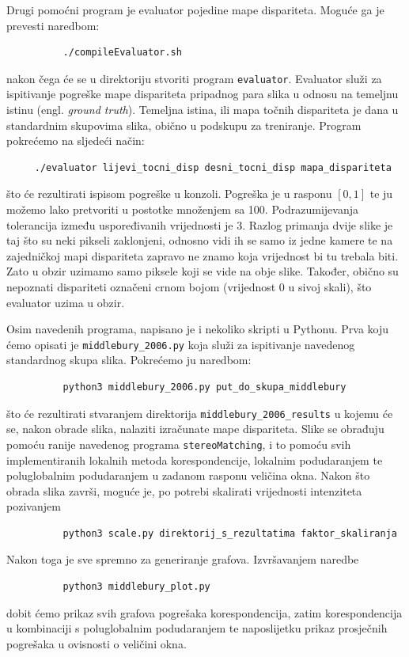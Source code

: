 \documentclass[utf8, zavrsni, numeric]{fer}
\begin{document}
Drugi pomoćni program je evaluator pojedine mape dispariteta. Moguće ga je prevesti naredbom:
\begin{verbatim}
          ./compileEvaluator.sh
\end{verbatim}
nakon čega će se u direktoriju stvoriti program {\tt evaluator}. Evaluator služi za ispitivanje
pogreške mape dispariteta pripadnog para slika u odnosu na temeljnu istinu (engl. {\sl ground truth}). Temeljna istina, ili mapa točnih dispariteta je dana u standardnim skupovima slika, 
obično u podskupu za treniranje. Program pokrećemo na sljedeći način:
\begin{verbatim}
     ./evaluator lijevi_tocni_disp desni_tocni_disp mapa_dispariteta
\end{verbatim}
što će rezultirati ispisom pogreške u konzoli. Pogreška je u rasponu $[0, 1]$ te ju možemo lako pretvoriti u postotke množenjem sa 100. Podrazumijevanja tolerancija između uspoređivanih vrijednosti je 3. Razlog primanja dvije slike je taj što su neki
pikseli zaklonjeni, odnosno vidi ih se samo iz jedne kamere te na zajedničkoj mapi dispariteta
zapravo ne znamo koja vrijednost bi tu trebala biti. Zato u obzir uzimamo samo piksele koji se vide na obje slike.
Također, obično su nepoznati dispariteti označeni crnom bojom (vrijednost 0 u sivoj skali), što evaluator uzima u obzir.

Osim navedenih programa, napisano je i nekoliko skripti u Pythonu. Prva koju ćemo opisati je
{\verb|middlebury_2006.py|} koja služi za ispitivanje navedenog standardnog skupa slika.
Pokrećemo ju naredbom:
\begin{verbatim}
          python3 middlebury_2006.py put_do_skupa_middlebury
\end{verbatim}
što će rezultirati stvaranjem direktorija {\verb|middlebury_2006_results|} u kojemu će se, nakon
obrade slika, nalaziti izračunate mape dispariteta. Slike se obrađuju pomoću ranije navedenog
programa {\verb|stereoMatching|}, i to pomoću svih implementiranih lokalnih metoda korespondencije, lokalnim
podudaranjem te poluglobalnim podudaranjem u zadanom rasponu veličina okna.
Nakon što obrada slika završi, moguće je, po potrebi skalirati vrijednosti intenziteta
pozivanjem
\begin{verbatim}
          python3 scale.py direktorij_s_rezultatima faktor_skaliranja
\end{verbatim}

Nakon toga je sve spremno za generiranje grafova. Izvršavanjem naredbe
\begin{verbatim}
          python3 middlebury_plot.py
\end{verbatim}
dobit ćemo prikaz svih grafova pogrešaka korespondencija, zatim korespondencija u kombinaciji
s poluglobalnim podudaranjem te naposlijetku prikaz prosječnih pogrešaka u ovisnosti o
veličini okna.
\end{document}
